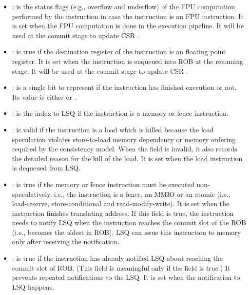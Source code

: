 \begin{itemize}
    \item {}: is the status flags (e.g., overflow and underflow) of the FPU computation performed by the instruction in case the instruction is an FPU instruction.
    It is set when the FPU computation is done in the execution pipeline.
    It will be used at the commit stage to update CSR .
    
    \item {}: is true if the destination register of the instruction is an floating point register.
    It is set when the instruction is enqueued into ROB at the renaming stage.
    It will be used at the commit stage to update CSR .
    
    \item {}: is a single bit to represent if the instruction has finished execution or not.
    Its value is either  or .
    
    \item {}: is the index to LSQ if the instruction is a memory or fence instruction.
    
    \item {}: is valid if the instruction is a load which is killed because the load speculation violates store-to-load memory dependency or memory ordering required by the consistency model.
    When the field is invalid, it also records the detailed reason for the kill of the load.
    It is set when the load instruction is dequeued from LSQ.
    
    \item {}: is true if the memory or fence instruction must be executed non-speculatively, i.e., the instruction is a fence, an MMIO or an atomic (i.e., load-reserve, store-conditional and read-modify-write).
    It is set when the instruction finishes translating address.
    If this field is true, the instruction needs to notify LSQ when the instruction reaches the commit slot of the ROB (i.e., becomes the oldest in ROB).
    LSQ can issue this instruction to memory only after receiving the notification.
    
    \item {}: is true if the instruction has already notified LSQ about reaching the commit slot of ROB.
    (This field is meaningful only if the  field is true.)
    It prevents repeated notifications to the LSQ.
    It is set when the notification to LSQ happens.
    

\end{itemize}
